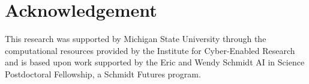 \section*{Acknowledgement}

This research was supported by Michigan State University through the computational resources provided by the Institute for Cyber-Enabled Research and is based upon work supported by the Eric and Wendy Schmidt AI in Science Postdoctoral Fellowship, a Schmidt Futures program.
